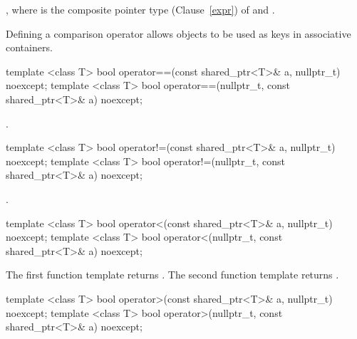 \begin{itemdescr}
\pnum\returns {},
where  is the composite pointer type (Clause~\ref{expr}) of  and .

\pnum \enternote
Defining a comparison operator allows  objects to be
used as keys in associative containers.
\exitnote

\end{itemdescr}

%
%
\begin{itemdecl}
template <class T>
  bool operator==(const shared_ptr<T>& a, nullptr_t) noexcept;
template <class T>
  bool operator==(nullptr_t, const shared_ptr<T>& a) noexcept;
\end{itemdecl}

\begin{itemdescr}
\pnum
\returns {}.
\end{itemdescr}

%
%
\begin{itemdecl}
template <class T>
  bool operator!=(const shared_ptr<T>& a, nullptr_t) noexcept;
template <class T>
  bool operator!=(nullptr_t, const shared_ptr<T>& a) noexcept;
\end{itemdecl}

\begin{itemdescr}
\pnum
\returns {}.
\end{itemdescr}

%
%
\begin{itemdecl}
template <class T>
  bool operator<(const shared_ptr<T>& a, nullptr_t) noexcept;
template <class T>
  bool operator<(nullptr_t, const shared_ptr<T>& a) noexcept;
\end{itemdecl}

\begin{itemdescr}
\pnum
\returns
The first function template returns
.
The second function template returns
.
\end{itemdescr}

%
%
\begin{itemdecl}
template <class T>
  bool operator>(const shared_ptr<T>& a, nullptr_t) noexcept;
template <class T>
  bool operator>(nullptr_t, const shared_ptr<T>& a) noexcept;
\end{itemdecl}

